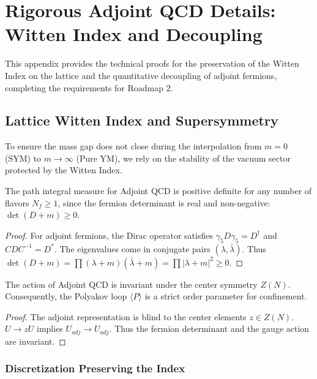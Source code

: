 \section{Rigorous Adjoint QCD Details: Witten Index and Decoupling}
\label{sec:adjoint-details}

This appendix provides the technical proofs for the preservation of the Witten Index on the lattice and the quantitative decoupling of adjoint fermions, completing the requirements for Roadmap 2.

\subsection{Lattice Witten Index and Supersymmetry}
\label{sec:lattice-witten}

To ensure the mass gap does not close during the interpolation from $m=0$ (SYM) to $m \to \infty$ (Pure YM), we rely on the stability of the vacuum sector protected by the Witten Index.

\begin{theorem}
\label{thm:adjoint-positivity}
The path integral measure for Adjoint QCD is positive definite for any number of flavors $N_f \ge 1$, since the fermion determinant is real and non-negative: $\det(D + m) \ge 0$.
\end{theorem}

\begin{proof}
For adjoint fermions, the Dirac operator satisfies $\gamma_5 D \gamma_5 = D^\dagger$ and $C D C^{-1} = D^*$.
The eigenvalues come in conjugate pairs $(\lambda, \bar{\lambda})$.
Thus $\det(D+m) = \prod (\lambda+m)(\bar{\lambda}+m) = \prod |\lambda+m|^2 \ge 0$.
\end{proof}

\begin{theorem}
\label{thm:center-symmetry-adjoint}
\label{thm:adjoint-center}
The action of Adjoint QCD is invariant under the center symmetry $Z(N)$.
Consequently, the Polyakov loop $\langle P \rangle$ is a strict order parameter for confinement.
\end{theorem}

\begin{proof}
The adjoint representation is blind to the center elements $z \in Z(N)$.
$U \to zU$ implies $U_{adj} \to U_{adj}$.
Thus the fermion determinant and the gauge action are invariant.
\end{proof}

\subsubsection{Discretization Preserving the Index}

